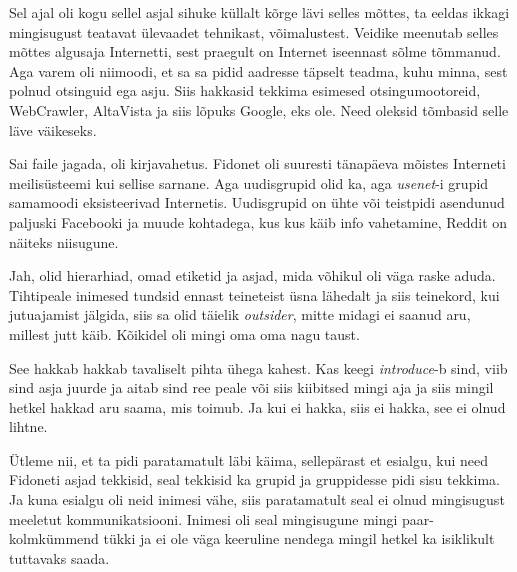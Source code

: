 Sel ajal oli kogu sellel asjal sihuke küllalt kõrge lävi selles mõttes, ta 
eeldas ikkagi mingisugust teatavat ülevaadet tehnikast, võimalustest. Veidike 
meenutab selles mõttes algusaja Internetti, sest praegult on Internet iseennast 
sõlme tõmmanud. Aga varem oli niimoodi, et sa sa pidid aadresse täpselt teadma, 
kuhu minna, sest polnud otsinguid ega asju. Siis hakkasid tekkima esimesed 
otsingumootoreid, WebCrawler, AltaVista ja siis lõpuks Google, eks ole. Need 
oleksid tõmbasid selle läve  väikeseks. 

                 
Sai faile jagada, oli kirjavahetus. Fidonet oli suuresti tänapäeva mõistes 
Interneti meilisüsteemi kui sellise sarnane. Aga uudisgrupid olid ka, aga 
\emph{usenet}-i grupid samamoodi eksisteerivad Internetis. Uudisgrupid on ühte 
või teistpidi asendunud paljuski Facebooki ja muude kohtadega, kus kus käib 
info vahetamine, Reddit on näiteks niisugune.


Jah, olid hierarhiad, omad etiketid ja asjad, mida võhikul oli väga raske 
aduda. Tihtipeale inimesed tundsid ennast teineteist üsna lähedalt ja siis 
teinekord, kui jutuajamist jälgida, siis sa olid täielik \emph{outsider}, mitte 
midagi ei saanud aru, millest jutt käib. Kõikidel oli mingi oma oma nagu taust.


See hakkab hakkab tavaliselt pihta ühega kahest. Kas keegi \emph{introduce}-b 
sind, viib sind asja juurde ja aitab sind ree peale või siis kiibitsed mingi 
aja ja siis mingil hetkel hakkad aru saama, mis toimub. Ja kui ei hakka, siis 
ei hakka, see ei olnud lihtne.


Ütleme nii, et ta pidi paratamatult läbi käima, sellepärast et esialgu, kui 
need Fidoneti asjad tekkisid, seal tekkisid ka grupid ja gruppidesse pidi sisu 
tekkima. Ja kuna esialgu oli neid inimesi vähe, siis paratamatult seal ei olnud 
mingisugust meeletut kommunikatsiooni. Inimesi oli seal mingisugune mingi 
paar-kolmkümmend tükki ja ei ole väga keeruline nendega  mingil hetkel ka 
isiklikult tuttavaks saada.


